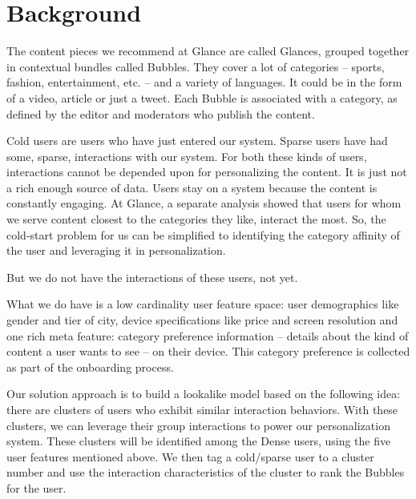 \section{Background}
The content pieces we recommend at Glance are called Glances, grouped together in contextual bundles called Bubbles. They cover a lot of categories – sports, fashion, entertainment, etc. – and a variety of languages. It could be in the form of a video, article or just a tweet. Each Bubble is associated with a category, as defined by the editor and moderators who publish the content. 

Cold users are users who have just entered our system. Sparse users have had some, sparse, interactions with our system. For both these kinds of users, interactions cannot be depended upon for personalizing the content. It is just not a rich enough source of data. Users stay on a system because the content is constantly engaging. At Glance, a separate analysis showed that users for whom we serve content closest to the categories they like, interact the most. So, the cold-start problem for us can be simplified to identifying the category affinity of the user and leveraging it in personalization. 

But we do not have the interactions of these users, not yet. 

What we do have is a low cardinality user feature space: user demographics like gender and tier of city, device specifications like price and screen resolution and one rich meta feature: category preference information – details about the kind of content a user wants to see – on their device. This category preference is collected as part of the onboarding process. 

Our solution approach is to build a lookalike model based on the following idea: there are clusters of users who exhibit similar interaction behaviors. With these clusters, we can leverage their group interactions to power our personalization system. These clusters will be identified among the Dense users, using the five user features mentioned above. We then tag a cold/sparse user to a cluster number and use the interaction characteristics of the cluster to rank the Bubbles for the user.  

